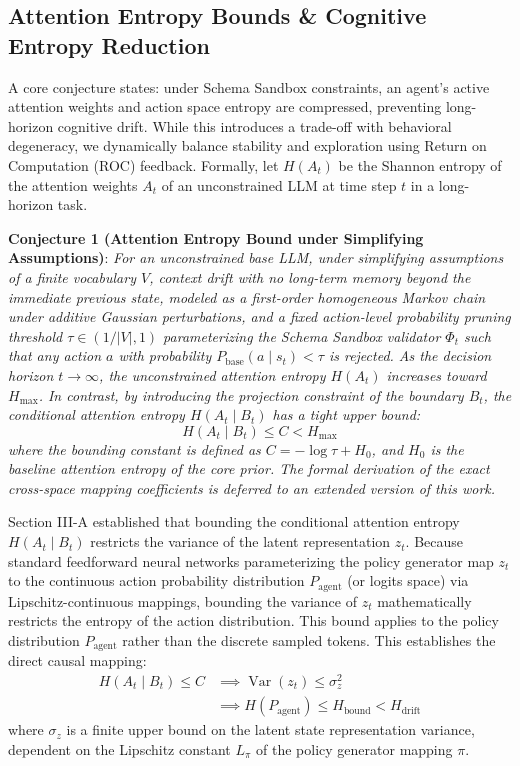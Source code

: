 \documentclass[10pt,journal,compsoc]{IEEEtran}
\begin{document}
\subsection{Attention Entropy Bounds \& Cognitive Entropy Reduction}
A core conjecture states: under Schema Sandbox constraints, an agent's active attention weights and action space entropy are compressed, preventing long-horizon cognitive drift. While this introduces a trade-off with behavioral degeneracy, we dynamically balance stability and exploration using Return on Computation (ROC) feedback. Formally, let $H(A_t)$ be the Shannon entropy of the attention weights $A_t$ of an unconstrained LLM at time step $t$ in a long-horizon task.

\textbf{Conjecture 1 (Attention Entropy Bound under Simplifying Assumptions)}: \textit{For an unconstrained base LLM, under simplifying assumptions of a finite vocabulary $V$, context drift with no long-term memory beyond the immediate previous state, modeled as a first-order homogeneous Markov chain under additive Gaussian perturbations, and a fixed action-level probability pruning threshold $\tau \in (1/|V|, 1)$ parameterizing the Schema Sandbox validator $\Phi_t$ such that any action $a$ with probability $P_{\text{base}}(a \mid s_t) < \tau$ is rejected. As the decision horizon $t \to \infty$, the unconstrained attention entropy $H(A_t)$ increases toward $H_{\max}$. In contrast, by introducing the projection constraint of the boundary $B_t$, the conditional attention entropy $H(A_t \mid B_t)$ has a tight upper bound:}
\begin{equation}
H(A_t \mid B_t) \le C < H_{\max}
\end{equation}
\textit{where the bounding constant is defined as $C = -\log \tau + H_0$, and $H_0$ is the baseline attention entropy of the core prior. The formal derivation of the exact cross-space mapping coefficients is deferred to an extended version of this work.}

Section III-A established that bounding the conditional attention entropy $H(A_t \mid B_t)$ restricts the variance of the latent representation $z_t$. Because standard feedforward neural networks parameterizing the policy generator map $z_t$ to the continuous action probability distribution $P_{\text{agent}}$ (or logits space) via Lipschitz-continuous mappings, bounding the variance of $z_t$ mathematically restricts the entropy of the action distribution. This bound applies to the policy distribution $P_{\text{agent}}$ rather than the discrete sampled tokens. This establishes the direct causal mapping:
\begin{equation}
\begin{split}
H(A_t \mid B_t) \le C &\implies \operatorname{Var}(z_t) \le \sigma_z^2 \\
&\implies H(P_{\text{agent}}) \le H_{\text{bound}} < H_{\text{drift}}
\end{split}
\end{equation}
where $\sigma_z$ is a finite upper bound on the latent state representation variance, dependent on the Lipschitz constant $L_\pi$ of the policy generator mapping $\pi$.
\end{document}
